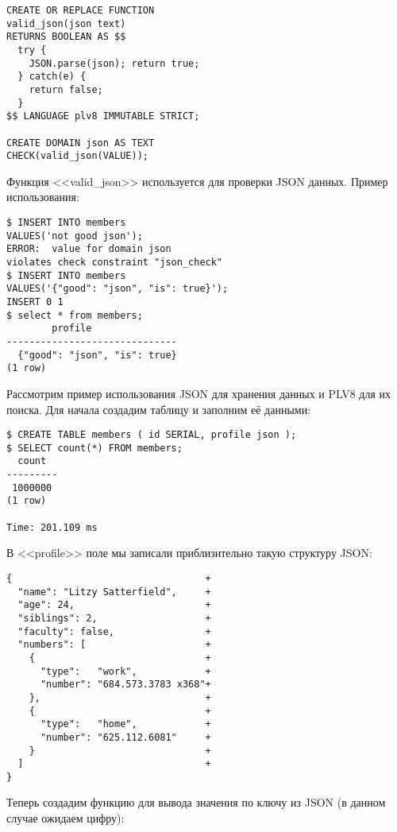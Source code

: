\begin{lstlisting}[label=lst:plv8js7,caption=Создание типа JSON]
CREATE OR REPLACE FUNCTION
valid_json(json text)
RETURNS BOOLEAN AS $$
  try {
    JSON.parse(json); return true;
  } catch(e) {
    return false;
  }
$$ LANGUAGE plv8 IMMUTABLE STRICT;

CREATE DOMAIN json AS TEXT
CHECK(valid_json(VALUE));
\end{lstlisting}

Функция <<valid\_json>> используется для проверки JSON данных. Пример использования:

\begin{lstlisting}[label=lst:plv8js8,caption=Проверка JSON]
$ INSERT INTO members
VALUES('not good json');
ERROR:  value for domain json
violates check constraint "json_check"
$ INSERT INTO members
VALUES('{"good": "json", "is": true}');
INSERT 0 1
$ select * from members;
	    profile
------------------------------
  {"good": "json", "is": true}
(1 row)
\end{lstlisting}

Рассмотрим пример использования JSON для хранения данных и PLV8 для их поиска. Для начала создадим таблицу и заполним её данными:

\begin{lstlisting}[label=lst:plv8js9,caption=Таблица с JSON полем]
$ CREATE TABLE members ( id SERIAL, profile json );
$ SELECT count(*) FROM members;
  count
---------
 1000000
(1 row)

Time: 201.109 ms
\end{lstlisting}

В <<profile>> поле мы записали приблизительно такую структуру JSON:

\begin{lstlisting}[label=lst:plv8js10,caption=JSON структура]
{                                  +
  "name": "Litzy Satterfield",     +
  "age": 24,                       +
  "siblings": 2,                   +
  "faculty": false,                +
  "numbers": [                     +
    {                              +
      "type":   "work",            +
      "number": "684.573.3783 x368"+
    },                             +
    {                              +
      "type":   "home",            +
      "number": "625.112.6081"     +
    }                              +
  ]                                +
}
\end{lstlisting}

Теперь создадим функцию для вывода значения по ключу из JSON (в данном случае ожидаем цифру):

